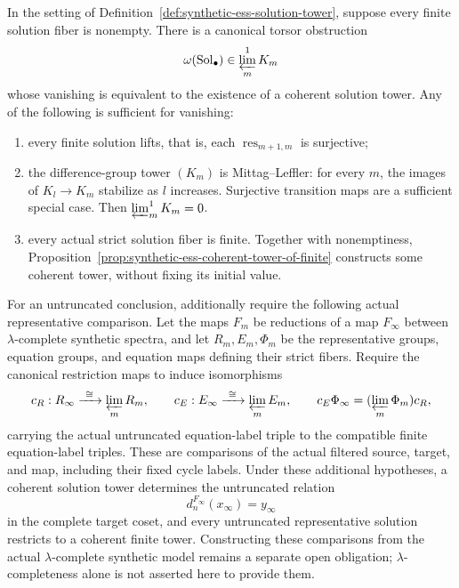 \begin{lemma}
  \label{lem:synthetic-ess-coherent-tower-limit}
  \notready
  In the setting of
  Definition~\ref{def:synthetic-ess-solution-tower}, suppose every finite
  solution fiber is nonempty.  There is a canonical torsor obstruction
  \[
    \omega(\operatorname{Sol}_\bullet)
      \in \varprojlim^{1}_{m} K_m
  \]
  whose vanishing is equivalent to the existence of a coherent solution
  tower.  Any of the following is sufficient for vanishing:
  \begin{enumerate}
    \item every finite solution lifts, that is, each
      $\operatorname{res}_{m+1,m}$ is surjective;
    \item the difference-group tower $(K_m)$ is Mittag--Leffler: for every
      $m$, the images of $K_l\to K_m$ stabilize as $l$ increases.  Surjective
      transition maps are a sufficient special case.  Then
      $\varprojlim^1_m K_m=0$.
    \item every actual strict solution fiber is finite.  Together with
      nonemptiness, Proposition~\ref{prop:synthetic-ess-coherent-tower-of-finite}
      constructs some coherent tower, without fixing its initial value.
  \end{enumerate}
  For an untruncated conclusion, additionally require the following actual
  representative comparison.  Let the maps $F_m$ be reductions of a map
  $F_\infty$ between $\lambda$-complete synthetic spectra, and let
  $R_m,E_m,\Phi_m$ be the representative groups, equation groups, and
  equation maps defining their strict fibers.  Require the canonical
  restriction maps to induce isomorphisms
  \[
    c_R:R_\infty\xrightarrow{\ \cong\ }\varprojlim_m R_m,
    \qquad
    c_E:E_\infty\xrightarrow{\ \cong\ }\varprojlim_m E_m,
    \qquad
    c_E\Phi_\infty=(\varprojlim_m\Phi_m)c_R,
  \]
  carrying the actual untruncated equation-label triple to the compatible
  finite equation-label triples.  These are comparisons of the actual
  filtered source, target, and map, including their fixed cycle labels.
  Under these additional hypotheses, a coherent solution tower determines
  the untruncated relation
  \[
    d_n^{F_\infty}(x_\infty)=y_\infty
  \]
  in the complete target coset, and every untruncated representative
  solution restricts to a coherent finite tower.  Constructing these
  comparisons from the actual $\lambda$-complete synthetic model remains
  a separate open obligation; $\lambda$-completeness alone is not asserted
  here to provide them.
\end{lemma}

